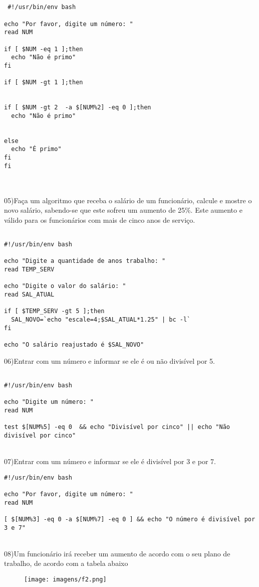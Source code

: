 \documentclass[a4paper,13pt]{article}
\begin{document}
\\
\begin{verbatim}

 #!/usr/bin/env bash

echo "Por favor, digite um número: "
read NUM

if [ $NUM -eq 1 ];then
  echo "Não é primo"
fi

if [ $NUM -gt 1 ];then


if [ $NUM -gt 2  -a $[NUM%2] -eq 0 ];then
  echo "Não é primo"


else
  echo "É primo"
fi
fi
 
\end{verbatim}
\\

05)Faça um algoritmo que receba o salário de um funcionário, calcule e mostre o novo salário, sabendo-se que este sofreu um aumento de 25\%. Este aumento e válido para os funcionários com mais de cinco anos de serviço.
\\
\begin{verbatim}

#!/usr/bin/env bash

echo "Digite a quantidade de anos trabalho: "
read TEMP_SERV

echo "Digite o valor do salário: "
read SAL_ATUAL

if [ $TEMP_SERV -gt 5 ];then
  SAL_NOVO=`echo "escale=4;$SAL_ATUAL*1.25" | bc -l`
fi

echo "O salário reajustado é $SAL_NOVO"

\end{verbatim}

06)Entrar com um número e informar se ele é ou não divisível por 5.
\begin{verbatim}

#!/usr/bin/env bash

echo "Digite um número: "
read NUM

test $[NUM%5] -eq 0  && echo "Divisível por cinco" || echo "Não divisível por cinco"

\end{verbatim}

\\
07)Entrar com um número e informar se ele é divisível por 3 e por 7.\\
\begin{verbatim}
#!/usr/bin/env bash

echo "Por favor, digite um número: "
read NUM

[ $[NUM%3] -eq 0 -a $[NUM%7] -eq 0 ] && echo "O número é divisível por 3 e 7"
\end{verbatim}
\\
08)Um funcionário irá receber um aumento de acordo com o seu plano de trabalho, de acordo com a tabela abaixo\\
\begin{figure}[H]
 \centering
 \texttt{[image: imagens/f2.png]}
\end{figure}
\end{document}
